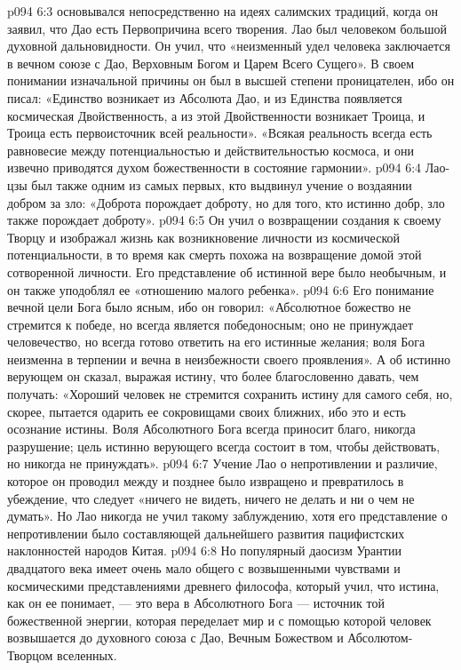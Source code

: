\vs p094 6:3 \pc {} основывался непосредственно на идеях салимских традиций, когда он заявил, что Дао есть Первопричина всего творения. Лао был человеком большой духовной дальновидности. Он учил, что «неизменный удел человека заключается в вечном союзе с Дао, Верховным Богом и Царем Всего Сущего». В своем понимании изначальной причины он был в высшей степени проницателен, ибо он писал: «Единство возникает из Абсолюта Дао, и из Единства появляется космическая Двойственность, а из этой Двойственности возникает Троица, и Троица есть первоисточник всей реальности». «Всякая реальность всегда есть равновесие между потенциальностью и действительностью космоса, и они извечно приводятся духом божественности в состояние гармонии».
\vs p094 6:4 Лао\hyp{}цзы был также одним из самых первых, кто выдвинул учение о воздаянии добром за зло: «Доброта порождает доброту, но для того, кто истинно добр, зло также порождает доброту».
\vs p094 6:5 Он учил о возвращении создания к своему Творцу и изображал жизнь как возникновение личности из космической потенциальности, в то время как смерть похожа на возвращение домой этой сотворенной личности. Его представление об истинной вере было необычным, и он также уподоблял ее «отношению малого ребенка».
\vs p094 6:6 Его понимание вечной цели Бога было ясным, ибо он говорил: «Абсолютное божество не стремится к победе, но всегда является победоносным; оно не принуждает человечество, но всегда готово ответить на его истинные желания; воля Бога неизменна в терпении и вечна в неизбежности своего проявления». А об истинно верующем он сказал, выражая истину, что более благословенно давать, чем получать: «Хороший человек не стремится сохранить истину для самого себя, но, скорее, пытается одарить ее сокровищами своих ближних, ибо это и есть осознание истины. Воля Абсолютного Бога всегда приносит благо, никогда разрушение; цель истинно верующего всегда состоит в том, чтобы действовать, но никогда не принуждать».
\vs p094 6:7 Учение Лао о непротивлении и различие, которое он проводил между  и  позднее было извращено и превратилось в убеждение, что следует «ничего не видеть, ничего не делать и ни о чем не думать». Но Лао никогда не учил такому заблуждению, хотя его представление о непротивлении было составляющей дальнейшего развития пацифистских наклонностей народов Китая.
\vs p094 6:8 Но популярный даосизм Урантии двадцатого века имеет очень мало общего с возвышенными чувствами и космическими представлениями древнего философа, который учил, что истина, как он ее понимает, --- это вера в Абсолютного Бога --- источник той божественной энергии, которая переделает мир и с помощью которой человек возвышается до духовного союза с Дао, Вечным Божеством и Абсолютом\hyp{}Творцом вселенных.

